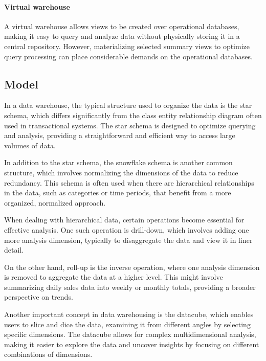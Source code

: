 \paragraph*{Virtual warehouse}
A virtual warehouse allows views to be created over operational databases, making it easy to query and analyze data without physically storing it in a central repository. 
However, materializing selected summary views to optimize query processing can place considerable demands on the operational databases.

\subsection{Model}
In a data warehouse, the typical structure used to organize the data is the star schema, which differs significantly from the class entity relationship diagram often used in transactional systems. 
The star schema is designed to optimize querying and analysis, providing a straightforward and efficient way to access large volumes of data.

In addition to the star schema, the snowflake schema is another common structure, which involves normalizing the dimensions of the data to reduce redundancy. 
This schema is often used when there are hierarchical relationships in the data, such as categories or time periods, that benefit from a more organized, normalized approach.

When dealing with hierarchical data, certain operations become essential for effective analysis. 
One such operation is drill-down, which involves adding one more analysis dimension, typically to disaggregate the data and view it in finer detail. 

On the other hand, roll-up is the inverse operation, where one analysis dimension is removed to aggregate the data at a higher level. 
This might involve summarizing daily sales data into weekly or monthly totals, providing a broader perspective on trends.

Another important concept in data warehousing is the datacube, which enables users to slice and dice the data, examining it from different angles by selecting specific dimensions. 
The datacube allows for complex multidimensional analysis, making it easier to explore the data and uncover insights by focusing on different combinations of dimensions.

